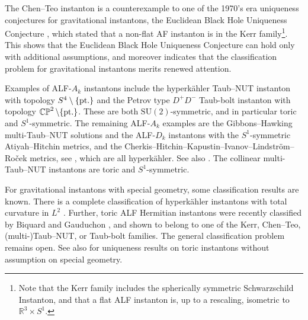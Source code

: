 \documentclass[a4paper,10pt,reqno]{amsart}
\newcommand{\Reals}{\mathbb{R}}
\theoremstyle{plain}
\DeclareMathOperator{\CP}{\mathbb{C}\mathbb{P}}
\newcommand{\SU}{\text{SU}}
\numberwithin{equation}{section}
\begin{document}
The Chen--Teo instanton is a counterexample to one of the 1970's era uniqueness conjectures for gravitational instantons, the Euclidean Black Hole Uniqueness Conjecture \cite[Conjecture 2]{gibbons:1978:survey}, which stated that a non-flat AF instanton is in the Kerr family\footnote{Note that the Kerr family includes the spherically symmetric Schwarzschild Instanton, and that a flat ALF instanton is, up to a rescaling,  isometric to $\Reals^3 \times S^1$.}. This shows that the Euclidean Black Hole Uniqueness Conjecture can hold only with additional assumptions, and moreover indicates that the classification problem for gravitational instantons merits renewed attention. 

Examples of ALF-$A_k$ instantons include the hyperk\"ahler Taub--NUT instanton \cite{hawking:1977:grav:instantons,lebrun:1989} with topology $S^4 \setminus \{\text{\rm pt.}\}$ and the Petrov type $D^+D^-$ Taub-bolt instanton \cite{1978PhLB...78..249P} with topology $\CP^2 \setminus \{\text{\rm pt.}\}$. These are both $\SU(2)$-symmetric, and in particular toric and $S^1$-symmetric. The remaining ALF-$A_k$ examples are the Gibbons--Hawking multi-Taub--NUT solutions and the ALF-$D_k$ instantons with the $S^1$-symmetric Atiyah--Hitchin metrics, and the Cherkis--Hitchin--Kapus\-tin--Ivanov--Lindstr\"om--Ro\v{c}ek metrics, see \cite{MR2177322,chen2019gravitational}, which are all hyperkähler. See also \cite{MR2855540}. The collinear multi-Taub--NUT instantons are toric and $S^1$-symmetric. 

For gravitational instantons with special geometry, some classification results are known. There is a complete classification of  hyperk\"ahler instantons with total curvature in $L^2$ \cite{chen2015gravitational,chen2019gravitational,chen2021gravitational,2021arXiv210812991S}. Further, toric ALF Hermitian instantons were recently classified by Biquard and Gauduchon \cite{Biquard:Gauduchon}, and shown to belong to one of the Kerr, Chen--Teo, (multi-)Taub--NUT, or Taub-bolt families. The general classification problem remains open. See also \cite{2021LMaPh.111..133K} for uniqueness results on toric instantons without assumption on special geometry. 
\end{document}
